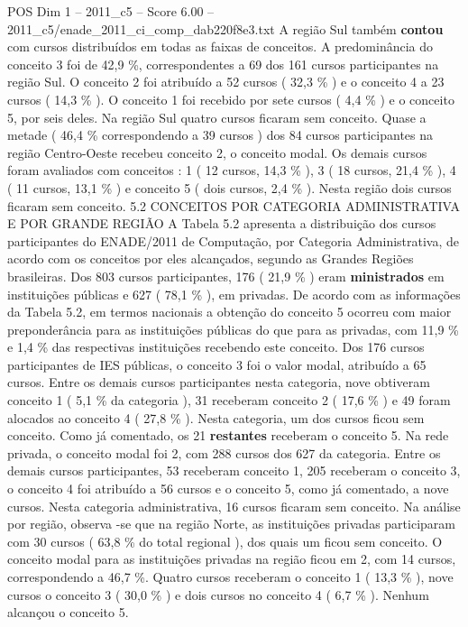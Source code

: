 \begin{textsample}{POS Dim 1 – 2011\_c5 – Score 6.00 – 2011\_c5/enade\_2011\_ci\_comp\_dab220f8e3.txt}
A região Sul também \textbf{contou} com cursos distribuídos em todas as faixas de conceitos.
A predominância do conceito 3 foi de 42,9 \%, correspondentes a 69 dos 161 cursos participantes na região Sul.
O conceito 2 foi atribuído a 52 cursos ( 32,3 \% ) e o conceito 4 a 23 cursos ( 14,3 \% ).
O conceito 1 foi recebido por sete cursos ( 4,4 \% ) e o conceito 5, por seis deles.
Na região Sul quatro cursos ficaram sem conceito.
Quase a metade ( 46,4 \% correspondendo a 39 cursos ) dos 84 cursos participantes na região Centro-Oeste recebeu conceito 2, o conceito modal.
Os demais cursos foram avaliados com conceitos : 1 ( 12 cursos, 14,3 \% ), 3 ( 18 cursos, 21,4 \% ), 4 ( 11 cursos, 13,1 \% ) e conceito 5 ( dois cursos, 2,4 \% ).
Nesta região dois cursos ficaram sem conceito. 5.2 CONCEITOS POR CATEGORIA ADMINISTRATIVA E POR GRANDE REGIÃO A Tabela 5.2 apresenta a distribuição dos cursos participantes do ENADE/2011 de Computação, por Categoria Administrativa, de acordo com os conceitos por eles alcançados, segundo as Grandes Regiões brasileiras.
Dos 803 cursos participantes, 176 ( 21,9 \% ) eram \textbf{ministrados} em instituições públicas e 627 ( 78,1 \% ), em privadas.
De acordo com as informações da Tabela 5.2, em termos nacionais a obtenção do conceito 5 ocorreu com maior preponderância para as instituições públicas do que para as privadas, com 11,9 \% e 1,4 \% das respectivas instituições recebendo este conceito.
Dos 176 cursos participantes de IES públicas, o conceito 3 foi o valor modal, atribuído a 65 cursos.
Entre os demais cursos participantes nesta categoria, nove obtiveram conceito 1 ( 5,1 \% da categoria ), 31 receberam conceito 2 ( 17,6 \% ) e 49 foram alocados ao conceito 4 ( 27,8 \% ).
Nesta categoria, um dos cursos ficou sem conceito.
Como já comentado, os 21 \textbf{restantes} receberam o conceito 5.
Na rede privada, o conceito modal foi 2, com 288 cursos dos 627 da categoria.
Entre os demais cursos participantes, 53 receberam conceito 1, 205 receberam o conceito 3, o conceito 4 foi atribuído a 56 cursos e o conceito 5, como já comentado, a nove cursos.
Nesta categoria administrativa, 16 cursos ficaram sem conceito.
Na análise por região, observa -se que na região Norte, as instituições privadas participaram com 30 cursos ( 63,8 \% do total regional ), dos quais um ficou sem conceito.
O conceito modal para as instituições privadas na região ficou em 2, com 14 cursos, correspondendo a 46,7 \%.
Quatro cursos receberam o conceito 1 ( 13,3 \% ), nove cursos o conceito 3 ( 30,0 \% ) e dois cursos no conceito 4 ( 6,7 \% ).
Nenhum alcançou o conceito 5.

\end{textsample}
